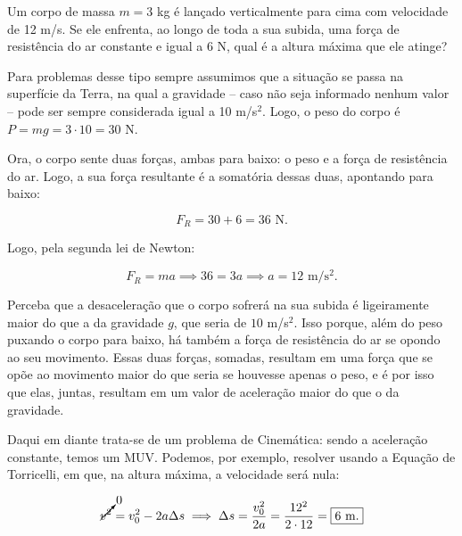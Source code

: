 \begin{exemplo}[Nível I]\label{exemplo_dinamicanewton_p=mg01}

Um corpo de massa $m=3$ kg é lançado verticalmente para cima com velocidade de 12 m/s. Se ele enfrenta, ao longo de toda a sua subida, uma força de resistência do ar constante e igual a $6$ N, qual é a altura máxima que ele atinge?

\resolucao

Para problemas desse tipo sempre assumimos que a situação se passa na superfície da Terra, na qual a gravidade -- caso não seja informado nenhum valor -- pode ser sempre considerada igual a 10 m/s$^2$. Logo, o peso do corpo é $P=mg=3\cdot 10 = 30$ N.

Ora, o corpo sente duas forças, ambas para baixo: o peso e a força de resistência do ar. Logo, a sua força resultante é a somatória dessas duas, apontando para baixo:

$$ F_R = 30 +  6 = 36 \text{ N}.$$

Logo, pela segunda lei de Newton:

$$ F_R = ma \implies 36 = 3a \implies a = 12 \text{ m/s$^2$}.$$

Perceba que a desaceleração que o corpo sofrerá na sua subida é ligeiramente maior do que a da gravidade $g$, que seria de $10$ m/s$^2$. Isso porque, além do peso puxando o corpo para baixo, há também a força de resistência do ar se opondo ao seu movimento. Essas duas forças, somadas, resultam em uma força que se opõe ao movimento maior do que seria se houvesse apenas o peso, e é por isso que elas, juntas, resultam em um valor de aceleração maior do que o da gravidade.

Daqui em diante trata-se de um problema de Cinemática: sendo a aceleração constante, temos um MUV. Podemos, por exemplo, resolver usando a Equação de Torricelli, em que, na altura máxima, a velocidade será nula:

$$ \cancelto{0}{v^2} = v_0^2 - 2 a \Delta s \implies \Delta s = \dfrac{v_0^2}{2a} = \dfrac{12^2}{2\cdot 12} = \boxed{ 6 \text{ m.}} $$

\end{exemplo}


\vspace{0.3cm}

